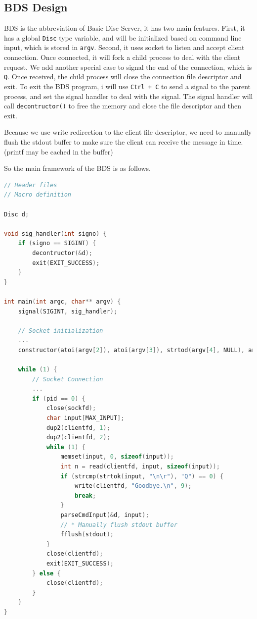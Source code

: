 \subsection{BDS Design}
BDS is the abbreviation of Basic Disc Server, it has two main features. 
First, it has a global \texttt{Disc} type variable, and will be initialized 
based on command line input, which is stored in \texttt{argv}. Second, it uses 
socket to listen and accept client connection. Once connected, it will fork a child process to deal with the client request.
We add another special case to signal the end of the connection, which is \texttt{Q}.
Once received, the child process will close the connection file descriptor and exit. To exit the BDS program, 
i will use \texttt{Ctrl + C} to send a signal to the parent process, and set the signal handler to deal with the signal.
The signal handler will call \texttt{decontructor()} to free the memory and close the file descriptor and then exit.

Because we use write redirection to the client file descriptor, we need to manually flush the stdout buffer to make sure the client can receive the message in time. (printf may be cached in the buffer)

So the main framework of the BDS is as follows.

\begin{lstlisting}[language=C]
// Header files
// Macro definition

Disc d;

void sig_handler(int signo) {
    if (signo == SIGINT) {
        decontructor(&d);
        exit(EXIT_SUCCESS);
    }
}

int main(int argc, char** argv) {
    signal(SIGINT, sig_handler);
    
    // Socket initialization
    ... 
    constructor(atoi(argv[2]), atoi(argv[3]), strtod(argv[4], NULL), argv[1], &d);
    
    while (1) {
        // Socket Connection
        ... 
        if (pid == 0) {
            close(sockfd);
            char input[MAX_INPUT];
            dup2(clientfd, 1);
            dup2(clientfd, 2);
            while (1) {
                memset(input, 0, sizeof(input));
                int n = read(clientfd, input, sizeof(input));
                if (strcmp(strtok(input, "\n\r"), "Q") == 0) {
                    write(clientfd, "Goodbye.\n", 9);
                    break;
                }
                parseCmdInput(&d, input);
                // * Manually flush stdout buffer
                fflush(stdout);
            }
            close(clientfd);
            exit(EXIT_SUCCESS);
        } else {
            close(clientfd);
        }
    }
}    
\end{lstlisting}

